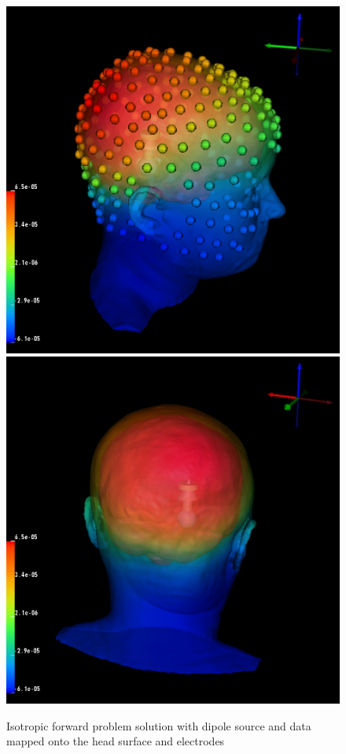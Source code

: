 \begin{figure}[H]
\begin{center}
\includegraphics[width=.49\textwidth]{Figures/iso_dipole}
\includegraphics[width=.49\textwidth]{Figures/iso_dipole_2}
\caption{Isotropic forward problem solution with dipole source and data mapped onto the head surface and electrodes}
\label{fig:isodip}
\end{center}
\end{figure}

